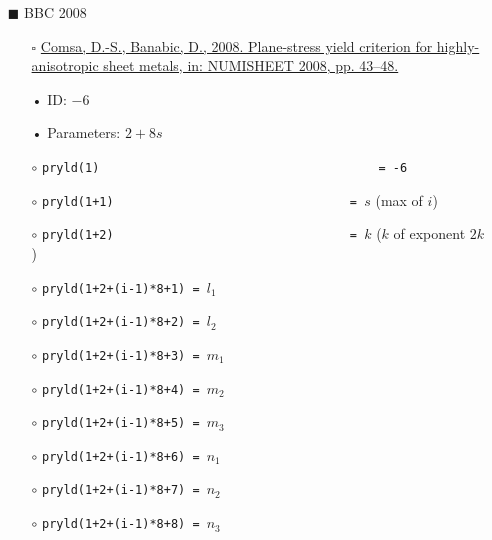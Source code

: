\documentclass[11pt,a4paper,twoside,final,onecolumn,titlepage]{article}
\begin{document}
\begin{itemize}
	\item[\tiny$\blacksquare$] BBC 2008
	\begin{itemize}
		\item[\tiny$\square$] {\small \href{http://users.utcluj.ro/~banabic/documents/researchfields/NUMISHEET%202008_2.pdf}{Comsa, D.-S., Banabic, D., 2008. Plane-stress yield criterion for highly-anisotropic sheet metals, in: NUMISHEET 2008, pp. 43–48.}}\\
		\item[•] ID: $-6$
		\item[•] Parameters: $2+8s$\\
		\item[$\circ$] \texttt{pryld(1)\,\,\,\,\,\,\,\,\,\,\,\,\,\,\,\,\,\,\,\,\,\,\,\,\,\,\,\,\,\,\,\,\,\,\,\,\,\,\,= -6}
		\item[$\circ$] \texttt{pryld(1+1)\,\,\,\,\,\,\,\,\,\,\,\,\,\,\,\,\,\,\,\,\,\,\,\,\,\,\,\,\,\,\,\,\,= $s$} (max of $i$)
		\item[$\circ$] \texttt{pryld(1+2)\,\,\,\,\,\,\,\,\,\,\,\,\,\,\,\,\,\,\,\,\,\,\,\,\,\,\,\,\,\,\,\,\,= $k$} ($k$ of exponent $2k$)
		\item[$\circ$] \texttt{pryld(1+2+(i-1)*8+1) = $l_1$}
		\item[$\circ$] \texttt{pryld(1+2+(i-1)*8+2) = $l_2$}
		\item[$\circ$] \texttt{pryld(1+2+(i-1)*8+3) = $m_1$}
		\item[$\circ$] \texttt{pryld(1+2+(i-1)*8+4) = $m_2$}
		\item[$\circ$] \texttt{pryld(1+2+(i-1)*8+5) = $m_3$}
		\item[$\circ$] \texttt{pryld(1+2+(i-1)*8+6) = $n_1$}
		\item[$\circ$] \texttt{pryld(1+2+(i-1)*8+7) = $n_2$}
		\item[$\circ$] \texttt{pryld(1+2+(i-1)*8+8) = $n_3$}\\
	\end{itemize}
\end{itemize}
\end{document}
